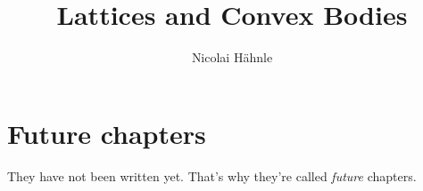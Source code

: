 \documentclass[a4paper,10pt]{scrbook}
\title{Lattices and Convex Bodies}
\author{Nicolai Hähnle}
\theoremstyle{plain}
\theoremstyle{definition}
\begin{document}
\maketitle

\tableofcontents







\chapter{Future chapters}
\label{chapter:not-yet}

They have not been written yet. That's why they're called \emph{future} chapters.





\end{document}
